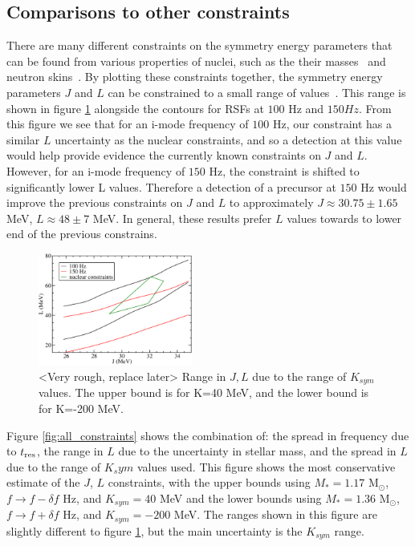 \documentclass[fleqn,usenatbib]{mnras}
\begin{document}
\subsection{Comparisons to other constraints}
\hspace{\parindent}There are many different constraints on the symmetry energy parameters that can be found from various properties of nuclei, such as the their masses~\cite{kortelainen2010nuclear} and neutron skins~\cite{chen2010density}. By plotting these constraints together, the symmetry energy parameters $J$ and $L$ can be constrained to a small range of values~\cite{balantekin2014nuclear}. This range is shown in figure \ref{fig:constraints} alongside the contours for RSFs at $100$ Hz and $150 Hz$.
From this figure we see that for an i-mode frequency of $100$ Hz, our constraint has a similar $L$ uncertainty as the nuclear constraints, and so a detection at this value would help provide evidence the currently known constraints on $J$ and $L$. However, for an i-mode frequency of $150$ Hz, the constraint is shifted to significantly lower L values. Therefore a detection of a precursor at $150$ Hz would improve the previous constraints on $J$ and $L$ to approximately $J\approx 30.75\pm 1.65$ MeV, $L\approx 48\pm 7$ MeV. In general, these results prefer $L$ values towards to lower end of the previous constrains. %

\begin{figure}
\centering
\includegraphics[width=0.45\textwidth,angle=0]{constraints_rough_2}
\caption{<Very rough, replace later> Range in $J,L$ due to the range of $K_{sym}$ values. The upper bound is for K=40 MeV, and the lower bound is for K=-200 MeV.}
\label{fig:constraints}
\end{figure}

\hspace{\parindent}Figure \ref{fig:all_constraints} shows the combination of: the spread in frequency due to $t_{\rm res}$, the range in $L$ due to the uncertainty in stellar mass, and the spread in $L$ due to the range of $K_sym$ values used. This figure shows the most conservative estimate of the $J$, $L$ constraints, with the upper bounds using $M_*=1.17$ M$_{\odot}$, $f\rightarrow f-\delta f$ Hz, and $K_{sym}=40$ MeV and the lower bounds using $M_*=1.36$ M$_{\odot}$, $f\rightarrow f+\delta f$ Hz, and $K_{sym}=-200$ MeV. The ranges shown in this figure are slightly different to figure \ref{fig:constraints}, but the main uncertainty is the $K_{sym}$ range.
\end{document}
